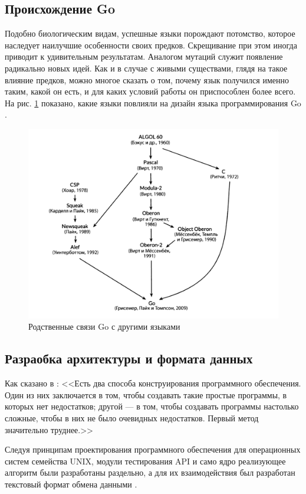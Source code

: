 \documentclass[14pt]{extarticle}
\begin{document}
	\subsection{Происхождение Go}
	Подобно биологическим видам, успешные языки порождают потомство, которое наследует наилучшие особенности своих предков. Скрещивание при этом иногда приводит к удивительным результатам. Аналогом мутаций служит появление радикально новых идей. Как и в случае с живыми существами, глядя на такое влияние предков, можно многое сказать о том, почему язык получился именно таким, какой он есть, и для каких условий работы он приспособлен более всего. На рис. \ref{goparents} показано, какие языки повлияли на дизайн языка программирования Go \cite{Golang}.
	\begin{figure}[h]
		\centering
		\includegraphics[scale=0.5]{goparents}
		\caption{Родственные связи Go с другими языками}
		\label{goparents}
	\end{figure}
	
	\subsection{Разраобка архитектуры и формата данных}
	Как сказано в \cite{Hoar}: <<Есть два способа конструирования программного обеспечения. Один из них заключается в том, чтобы создавать такие простые программы, в которых нет недостатков; другой --- в том, чтобы создавать программы настолько сложные, чтобы в них не было очевидных недостатков. Первый метод значительно труднее.>>
	
	Следуя принципам проектирования программного обеспечения для операционных систем семейства UNIX, модули тестирования API и само ядро реализующее алгоритм были разработаны раздельно, а для их взаимодействия был разработан текстовый формат обмена данными \cite{Unix}.
	
\end{document}
